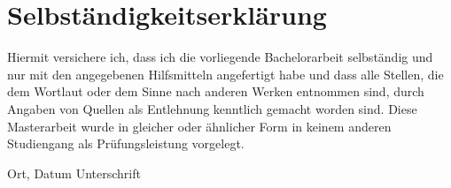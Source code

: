 \documentclass[twoside,12pt,a4paper]{report}
\begin{document}
\printindex
\cleardoublepage






\cleardoublepage
\thispagestyle{empty}
\section*{Selbst\"andigkeitserkl\"arung}

Hiermit versichere ich, dass ich die vorliegende Bachelorarbeit 
selbst\"andig und nur mit den angegebenen Hilfsmitteln angefertigt habe und dass alle Stellen, die dem Wortlaut oder dem 
Sinne nach anderen Werken entnommen sind, durch Angaben von Quellen als 
Entlehnung kenntlich gemacht worden sind. 
Diese Masterarbeit wurde in gleicher oder \"ahnlicher Form in keinem anderen 
Studiengang als Pr\"ufungsleistung vorgelegt. 

\vskip 3cm

Ort, Datum	\hfill Unterschrift \hfill 
\end{document}
